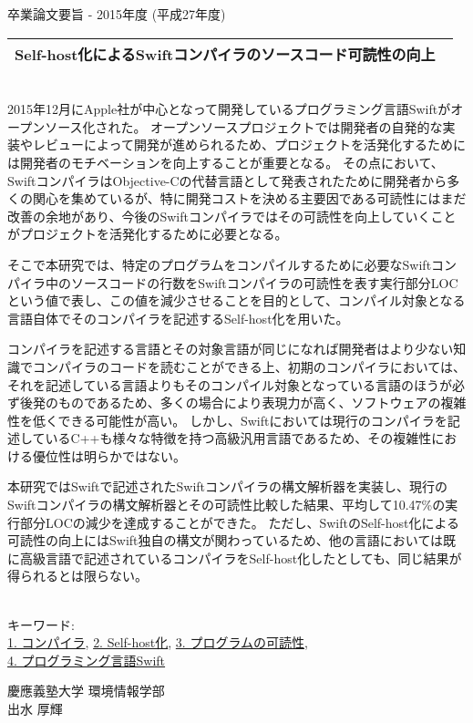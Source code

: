 卒業論文要旨 - 2015年度 (平成27年度)
\begin{center}
\begin{large}
\begin{tabular}{|M{0.97\linewidth}|}
    \hline
    Self-host化によるSwiftコンパイラのソースコード可読性の向上\\
    \hline
\end{tabular}
\end{large}
\end{center}

~ \\

2015年12月にApple社が中心となって開発しているプログラミング言語Swiftがオープンソース化された。
オープンソースプロジェクトでは開発者の自発的な実装やレビューによって開発が進められるため、プロジェクトを活発化するためには開発者のモチベーションを向上することが重要となる。
その点において、SwiftコンパイラはObjective-Cの代替言語として発表されたために開発者から多くの関心を集めているが、特に開発コストを決める主要因である可読性にはまだ改善の余地があり、今後のSwiftコンパイラではその可読性を向上していくことがプロジェクトを活発化するために必要となる。

そこで本研究では、特定のプログラムをコンパイルするために必要なSwiftコンパイラ中のソースコードの行数をSwiftコンパイラの可読性を表す実行部分LOCという値で表し、この値を減少させることを目的として、コンパイル対象となる言語自体でそのコンパイラを記述するSelf-host化を用いた。

コンパイラを記述する言語とその対象言語が同じになれば開発者はより少ない知識でコンパイラのコードを読むことができる上、初期のコンパイラにおいては、それを記述している言語よりもそのコンパイル対象となっている言語のほうが必ず後発のものであるため、多くの場合により表現力が高く、ソフトウェアの複雑性を低くできる可能性が高い。
しかし、Swiftにおいては現行のコンパイラを記述しているC++も様々な特徴を持つ高級汎用言語であるため、その複雑性における優位性は明らかではない。

本研究ではSwiftで記述されたSwiftコンパイラの構文解析器を実装し、現行のSwiftコンパイラの構文解析器とその可読性比較した結果、平均して10.47\%の実行部分LOCの減少を達成することができた。
ただし、SwiftのSelf-host化による可読性の向上にはSwift独自の構文が関わっているため、他の言語においては既に高級言語で記述されているコンパイラをSelf-host化したとしても、同じ結果が得られるとは限らない。

~ \\
キーワード:\\
\underline{1. コンパイラ},
\underline{2. Self-host化},
\underline{3. プログラムの可読性},\\
\underline{4. プログラミング言語Swift}
\begin{flushright}
慶應義塾大学 環境情報学部\\
出水 厚輝
\end{flushright}
